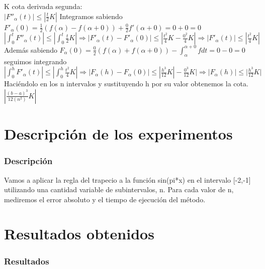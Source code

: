 \documentclass{beamer}
\begin{document}
\begin {frame}
  K cota derivada segunda:\\
  $|F''_\alpha(t)| \leq |\frac{t}{2} K|$
  \pause
  Integramos sabiendo $F'_\alpha(0)=\frac {1}{2} \left(f(\alpha)-f(\alpha+0) \right)+ \frac{0}{2} f'(\alpha+0)=0+0=0$\\
  \pause
  $|\int_0^t F''_\alpha(t)| \leq |\int_0^t\frac{t}{2} K| \Rightarrow |F'_\alpha(t)-F'_\alpha(0)| \leq |\frac{t^2}{4} K-\frac{0^2}{4} K| \Rightarrow |F'_\alpha(t)| \leq |\frac{t^2}{4} K|$
  \pause
  Además sabiendo
  $F_\alpha(0)=\frac{0}{2} \left(f(\alpha)+f(\alpha+0) \right)-\int_\alpha ^{\alpha+0} f dt=0-0=0$ seguimos integrando\\

  $|\int_0^h F'_\alpha(t)|\leq|\int_0^h \frac{t^2}{4} K| \Rightarrow |F_\alpha(h)-F_\alpha(0)| \leq |\frac{h^3}{12} K|-\frac{0^3}{12} K|\Rightarrow |F_\alpha(h)| \leq |\frac{h^3}{12} K|$
  \pause
  Haciéndolo en los n intervalos y sustituyendo h por su valor obtenemos la cota.\\

  $|\frac{(b-a)^3}{12 (n^2)} K|$
\end{frame}

\section{Descripción de los experimentos}
\begin{frame}
  \frametitle{Descripción}
  Vamos a aplicar la regla del trapecio a la función sin(pi*x) en el intervalo [-2,-1] utilizando una cantidad variable de subintervalos, n. Para cada valor de n, mediremos el error absoluto y el tiempo de ejecución del método.
\end{frame}

\section{Resultados obtenidos}
\begin{frame}
  \frametitle{Resultados}
  
\end{frame}
\end{document}
